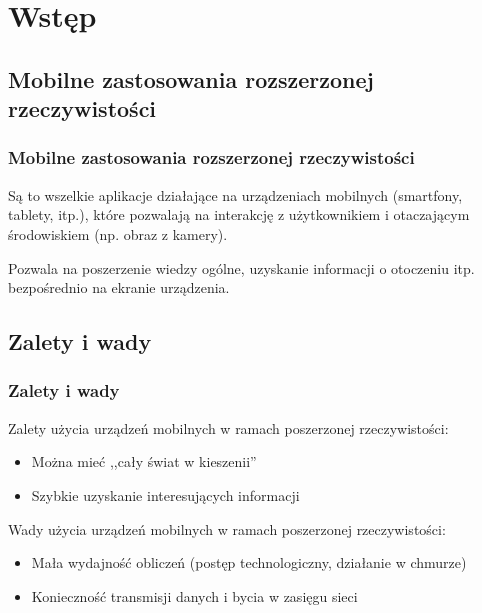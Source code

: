 \section{Wstęp}
\nextoc 

\subsection{Mobilne zastosowania rozszerzonej rzeczywistości}
\begin{frame}
    \frametitle{Mobilne zastosowania rozszerzonej rzeczywistości}

    Są to wszelkie aplikacje działające na urządzeniach mobilnych (smartfony, tablety, itp.), które pozwalają na interakcję z użytkownikiem i otaczającym środowiskiem (np. obraz z kamery).

    Pozwala na poszerzenie wiedzy ogólne, uzyskanie informacji o otoczeniu itp. bezpośrednio na ekranie urządzenia.
\end{frame}

\subsection{Zalety i wady}
\begin{frame}
    \frametitle{Zalety i wady}
    Zalety użycia urządzeń mobilnych w ramach poszerzonej rzeczywistości:
    \begin{itemize}
        \item Można mieć ,,cały świat w kieszenii''
        \item Szybkie uzyskanie interesujących informacji
    \end{itemize}
    Wady użycia urządzeń mobilnych w ramach poszerzonej rzeczywistości:
    \begin{itemize}
        \item Mała wydajność obliczeń (postęp technologiczny, działanie w chmurze)
        \item Konieczność transmisji danych i bycia w zasięgu sieci
    \end{itemize}
\end{frame}

